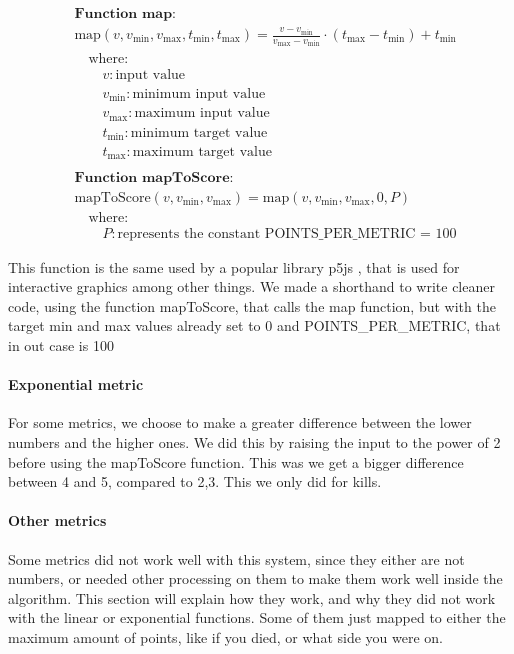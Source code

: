 \begin{align*}
& \textbf{Function map:} \\
& \text{map}(v, v_{\text{min}}, v_{\text{max}}, t_{\text{min}}, t_{\text{max}}) = \frac{v - v_{\text{min}}}{v_{\text{max}} - v_{\text{min}}} \cdot (t_{\text{max}} - t_{\text{min}}) + t_{\text{min}} \\
& \quad \text{where:}\\
& \quad \quad v: \text{input value}\\
& \quad \quad v_{\text{min}}: \text{minimum input value}\\
& \quad \quad v_{\text{max}}: \text{maximum input value}\\
& \quad \quad t_{\text{min}}: \text{minimum target value}\\
& \quad \quad t_{\text{max}}: \text{maximum target value}\\ \\
& \textbf{Function mapToScore:} \\
& \text{mapToScore}(v, v_{\text{min}}, v_{\text{max}}) = \text{map}(v, v_{\text{min}}, v_{\text{max}}, 0, P) \\
& \quad \text{where:}\\
& \quad \quad P:  \text{represents the constant POINTS\_PER\_METRIC = 100}
\end{align*}

This function is the same used by a popular library p5js \cite{p5jsMap}, that is used for interactive graphics among other things. We made a shorthand to write cleaner code, using the function mapToScore, that calls the map function, but with the target min and max values already set to 0 and POINTS\_PER\_METRIC, that in out case is 100


\paragraph{Exponential metric}
For some metrics, we choose to make a greater difference between the lower numbers and the higher ones. We did this by raising the input to the power of 2 before using the mapToScore function. This was we get a bigger difference between 4 and 5, compared to 2,3. This we only did for kills.

\paragraph{Other metrics}
Some metrics did not work well with this system, since they either are not numbers, or needed other processing on them to make them work well inside the algorithm. This section will explain how they work, and why they did not work with the linear or exponential functions. Some of them just mapped to either the maximum amount of points, like if you died, or what side you were on.
